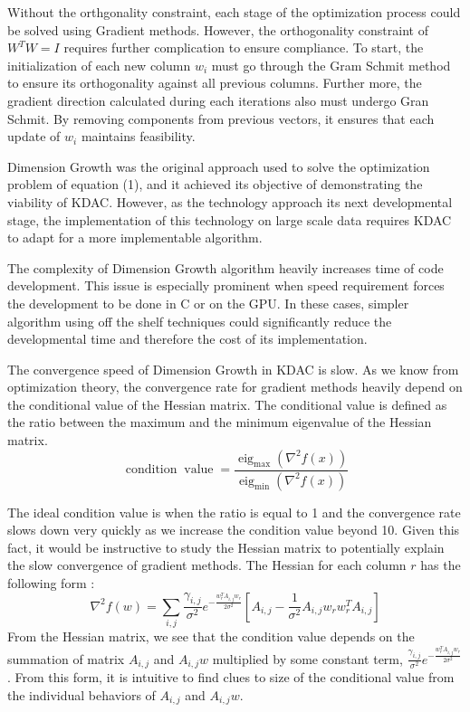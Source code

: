 \documentclass{article}
\newcommand{\tmop}[1]{\ensuremath{\operatorname{#1}}}
\begin{document}
Without the orthgonality constraint, each stage of the optimization process
could be solved using Gradient methods. However, the orthogonality constraint
of $W^T W = I$ requires further complication to ensure compliance. To start,
the initialization of each new column $w_i$ must go through the Gram Schmit
method to ensure its orthogonality against all previous columns. Further more,
the gradient direction calculated during each iterations also must undergo
Gran Schmit. By removing components from previous vectors, it ensures that
each update of $w_i$ maintains feasibility.



Dimension Growth was the original approach used to solve the optimization
problem of equation (1), and it achieved its objective of demonstrating the
viability of KDAC. However, as the technology approach its next developmental
stage, the implementation of this technology on large scale data requires KDAC
to adapt for a more implementable algorithm.



The complexity of Dimension Growth algorithm heavily increases time of code
development. This issue is especially prominent when speed requirement forces
the development to be done in C or on the GPU. In these cases, simpler
algorithm using off the shelf techniques could significantly reduce the
developmental time and therefore the cost of its implementation.

The convergence speed of Dimension Growth in KDAC is slow. As we know from
optimization theory, the convergence rate for gradient methods heavily depend
on the conditional value of the Hessian matrix. The conditional value is
defined as the ratio between the maximum and the minimum eigenvalue of the
Hessian matrix.
\[ \tmop{condition} \tmop{value} = \frac{\tmop{eig}_{\max} ( \nabla^2 f (
   x))}{\tmop{eig}_{\min} ( \nabla^2 f ( x))} \]


The ideal condition value is when the ratio is equal to 1 and the convergence
rate slows down very quickly as we increase the condition value beyond 10.
Given this fact, it would be instructive to study the Hessian matrix to
potentially explain the slow convergence of gradient methods. The Hessian for
each column $r$ has the following form :
\[ \nabla^2 f ( w) = \sum_{i, j} \frac{\gamma_{i, j}}{\sigma^2} e^{-
   \frac{w_r^T A_{i, j} w_r}{2 \sigma^2}} \left[ A_{i, j} - \frac{1}{\sigma^2}
   A_{i, j} w_r w_r^T A_{i, j} \right] \]
From the Hessian matrix, we see that the condition value depends on the
summation of matrix $A_{i, j}$ and $A_{i, j} w$ multiplied by some constant
term, $\frac{\gamma_{i, j}}{\sigma^2} e^{- \frac{w_r^T A_{i, j} w_r}{2
\sigma^2}}$. From this form, it is intuitive to find clues to size of the
conditional value from the individual behaviors of $A_{i, j}$ and $A_{i, j}
w$.
\end{document}
